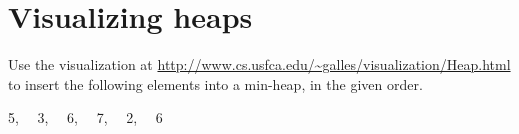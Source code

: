 \section*{Visualizing heaps%
}

Use the visualization at
\url{http://www.cs.usfca.edu/~galles/visualization/Heap.html} to
insert the following elements into a min-heap, in the given order.
\begin{center}
5, \ \
3, \ \
6, \ \
7, \ \
2, \ \
6
\end{center}
